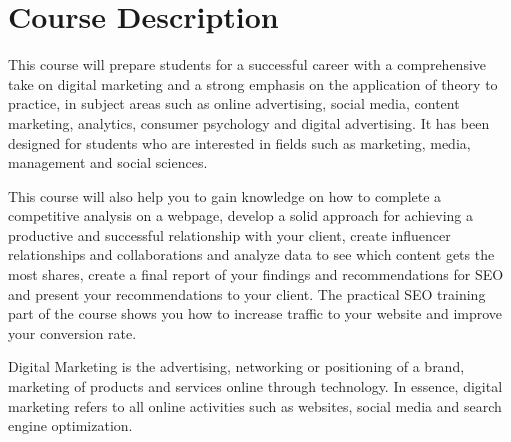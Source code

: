 
\section*{Course Description}



\bigskip
This course will prepare students for a successful career with a comprehensive take on digital marketing and a strong emphasis on the application of theory to practice, in subject areas such as online advertising, social media, content marketing, analytics, consumer psychology and digital advertising. It has been designed for students who are interested in fields such as marketing, media, management and social sciences.


\bigskip
This course will also help you to gain knowledge on how to complete a competitive analysis on a webpage, develop a solid approach for achieving a productive and successful relationship with your client, create influencer relationships and collaborations and analyze data to see which content gets the most shares, create a final report of your findings and recommendations for SEO and present your recommendations to your client. The practical SEO training part of the course shows you how to increase traffic to your website and improve your conversion rate. 

\bigskip
Digital Marketing is the advertising, networking or positioning of a brand, marketing of products and services online through technology. In essence, digital marketing refers to all online activities such as websites, social media and search engine optimization.